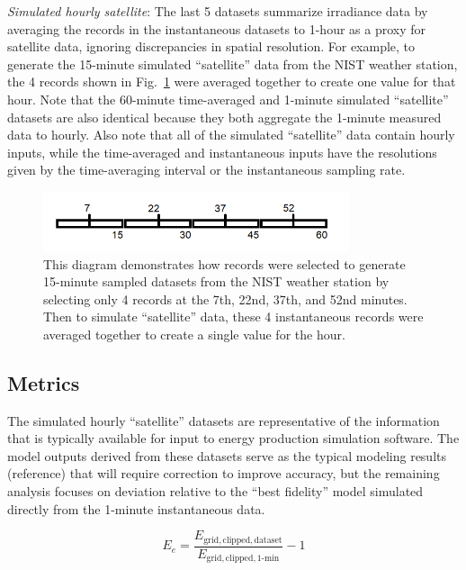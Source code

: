 \documentclass[conference]{IEEEtran}
\begin{document}
\emph{Simulated hourly satellite}: The last 5 datasets summarize irradiance data by averaging the records in the instantaneous datasets to 1-hour as a proxy for satellite data, ignoring discrepancies in spatial resolution. For example, to generate the 15-minute simulated ``satellite'' data from the NIST weather station, the 4 records shown in Fig.~\ref{fig:sampling-diagram} were averaged together to create one value for that hour. Note that the 60-minute time-averaged and 1-minute simulated ``satellite'' datasets are also identical because they both aggregate the 1-minute measured data to hourly. Also note that all of the simulated ``satellite'' data contain hourly inputs, while the time-averaged and instantaneous inputs have the resolutions given by the time-averaging interval or the instantaneous sampling rate.

\begin{figure}[htbp]
\centerline{\includegraphics[width=9cm]{sampling-diagram.png}}
\caption{This diagram demonstrates how records were selected to generate 15-minute sampled datasets from the NIST weather station by selecting only 4 records at the 7th, 22nd, 37th, and 52nd minutes. Then to simulate ``satellite'' data, these 4 instantaneous records were averaged together to create a single value for the hour.}
\label{fig:sampling-diagram}
\end{figure}

\subsection{Metrics}
The simulated hourly ``satellite'' datasets are representative of the information that is typically available for input to energy production simulation software. The model outputs derived from these datasets serve as the typical modeling results (reference) that will require correction to improve accuracy, but the remaining analysis focuses on deviation relative to the ``best fidelity'' model simulated directly from the 1-minute instantaneous data.

\begin{equation} \label{eq:1}
E_e = \frac{E_\mathrm{grid,clipped,dataset}}{E_\mathrm{grid,clipped,1\text{-}min}} - 1
\end{equation}
\end{document}
